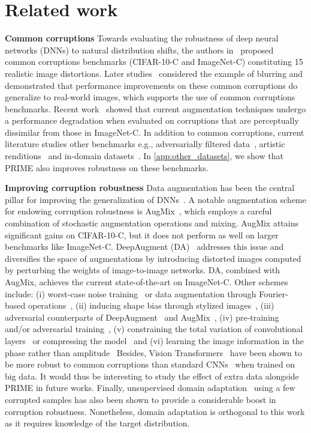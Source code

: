 \documentclass[runningheads]{llncs}
\begin{document}
\section{Related work}


\smallskip\noindent\textbf{Common corruptions} Towards evaluating the robustness of deep neural networks (DNNs) to natural distribution shifts, the authors in~\cite{corruptions2019} proposed common corruptions benchmarks (CIFAR-10-C and ImageNet-C) constituting 15 realistic image distortions. Later studies~\cite{deepaugment2021} considered the example of blurring and demonstrated that performance improvements on these common corruptions do generalize to real-world images, which supports the use of common corruptions benchmarks. Recent work~\cite{cbar2021} showed that current augmentation techniques undergo a performance degradation when evaluated on corruptions that are perceptually dissimilar from those in ImageNet-C. In addition to common corruptions, current literature studies other benchmarks e.g., adversarially filtered data~\cite{imageneta2021}, artistic renditions~\cite{deepaugment2021} and in-domain datasets~\cite{imagenetv22019}. In \cref{app:other_datasets}, we show that PRIME also improves robustness on these benchmarks.


\smallskip\noindent\noindent\textbf{Improving corruption robustness} Data augmentation has been the central pillar for improving the generalization of DNNs~\cite{cutout2017,mixup2018,autoaugment2019,cutmix2019,patchgaussian2019}. A notable augmentation scheme for endowing corruption robustness is AugMix~\cite{augmix2020}, which employs a careful combination of stochastic augmentation operations and mixing. AugMix attains significant gains on CIFAR-10-C, but it does not perform as well on larger benchmarks like ImageNet-C. DeepAugment (DA)~\cite{deepaugment2021} addresses this issue and diversifies the space of augmentations by introducing distorted images computed by perturbing the weights of image-to-image networks. DA, combined with AugMix, achieves the current state-of-the-art on ImageNet-C. Other schemes include: (i) worst-case noise training~\cite{ant2020} or data augmentation through Fourier-based operations~\cite{Sun2021Certified}, (ii) inducing shape bias through stylized images~\cite{styleimagenet2018}, (iii) adversarial counterparts of DeepAugment~\cite{calian2021} and AugMix~\cite{augmax2021}, (iv) pre-training and/or adversarial training~\cite{yi2021,kireev2021}, (v) constraining the total variation of convolutional layers~\cite{tvmin2021} or compressing the model~\cite{Diffenderfer2021Winning} and (vi) learning the image information in the phase rather than amplitude~\cite{chenAmplitute2021} 
Besides, Vision Transformers~\cite{vits} have been shown to be more robust to common corruptions than standard CNNs~\cite{Bhojanapalli2021,morrison2021} when trained on big data. It would thus be interesting to study the effect of extra data alongside PRIME in future works. Finally, unsupervised domain adaptation~\cite{bnadapt_so2021,bnadapt_bethge2021} using a few corrupted samples has also been shown to provide a considerable boost in corruption robustness. Nonetheless, domain adaptation is orthogonal to this work as it requires knowledge of the target distribution.
\end{document}
